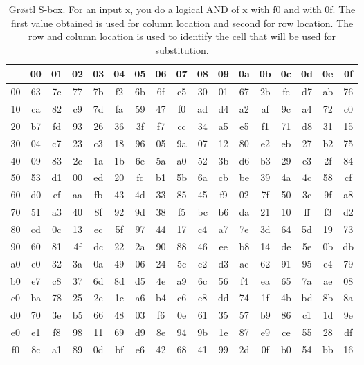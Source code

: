 \begin{itemize}
\begin{table}
\begin{center}
  \begin{tabular}{ c | *{16}{c}}
     & 00 & 01 & 02 & 03 & 04 & 05 & 06 & 07 & 08 & 09 & 0a & 0b & 0c & 0d & 0e & 0f \\ \hline
  00 & 63 & 7c & 77 & 7b & f2 & 6b & 6f & c5 & 30 & 01 & 67 & 2b & fe & d7 & ab & 76 \\ 
  10 & ca & 82 & c9 & 7d & fa & 59 & 47 & f0 & ad & d4 & a2 & af & 9c & a4 & 72 & c0 \\
  20 & b7 & fd & 93 & 26 & 36 & 3f & f7 & cc & 34 & a5 & e5 & f1 & 71 & d8 & 31 & 15 \\
  30 & 04 & c7 & 23 & c3 & 18 & 96 & 05 & 9a & 07 & 12 & 80 & e2 & eb & 27 & b2 & 75 \\
  40 & 09 & 83 & 2c & 1a & 1b & 6e & 5a & a0 & 52 & 3b & d6 & b3 & 29 & e3 & 2f & 84 \\
  50 & 53 & d1 & 00 & ed & 20 & fc & b1 & 5b & 6a & cb & be & 39 & 4a & 4c & 58 & cf \\
  60 & d0 & ef & aa & fb & 43 & 4d & 33 & 85 & 45 & f9 & 02 & 7f & 50 & 3c & 9f & a8 \\
  70 & 51 & a3 & 40 & 8f & 92 & 9d & 38 & f5 & bc & b6 & da & 21 & 10 & ff & f3 & d2 \\
  80 & cd & 0c & 13 & ec & 5f & 97 & 44 & 17 & c4 & a7 & 7e & 3d & 64 & 5d & 19 & 73 \\
  90 & 60 & 81 & 4f & dc & 22 & 2a & 90 & 88 & 46 & ee & b8 & 14 & de & 5e & 0b & db \\
  a0 & e0 & 32 & 3a & 0a & 49 & 06 & 24 & 5c & c2 & d3 & ac & 62 & 91 & 95 & e4 & 79 \\
  b0 & e7 & c8 & 37 & 6d & 8d & d5 & 4e & a9 & 6c & 56 & f4 & ea & 65 & 7a & ae & 08 \\
  c0 & ba & 78 & 25 & 2e & 1c & a6 & b4 & c6 & e8 & dd & 74 & 1f & 4b & bd & 8b & 8a \\
  d0 & 70 & 3e & b5 & 66 & 48 & 03 & f6 & 0e & 61 & 35 & 57 & b9 & 86 & c1 & 1d & 9e \\
  e0 & e1 & f8 & 98 & 11 & 69 & d9 & 8e & 94 & 9b & 1e & 87 & e9 & ce & 55 & 28 & df \\
  f0 & 8c & a1 & 89 & 0d & bf & e6 & 42 & 68 & 41 & 99 & 2d & 0f & b0 & 54 & bb & 16 \\
  \end{tabular}
  \caption{Gr{\o}stl S-box. For an input x, you do a logical AND of x with f0 and with 0f.
  The first value obtained is used for column location and second for row location. The
  row and column location is used to identify the cell that will be used for substitution.
  \cite{00019}}
  \label{table:Groestlsbox}
\end{center}
\end{table}


\end{itemize}
